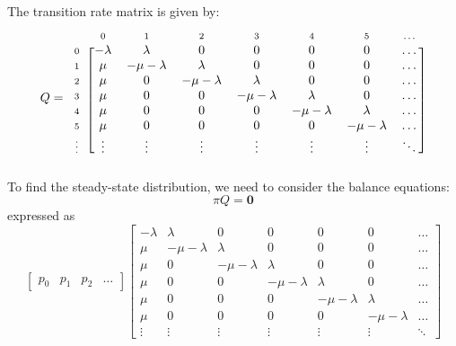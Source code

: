 \documentclass[12pt]{article}
\newcommand{\matindex}[1]{\mbox{\scriptsize#1}}%
\begin{document}
\noindent The transition rate matrix is given by: \begin{equation}
    Q = \begin{blockarray}{cccccccc}
        & \matindex{0} & \matindex{1} & \matindex{2} & \matindex{3} &\matindex{4} &\matindex{5} &\matindex{\dots} \\
        \begin{block}{c[ccccccc]}
            \matindex{0} & -\lambda & \lambda & 0 & 0 & 0 & 0 & \dots \\ 
            \matindex{1} & \mu & -\mu-\lambda & \lambda & 0 & 0 & 0 & \dots \\ 
            \matindex{2} & \mu & 0 & -\mu-\lambda & \lambda & 0 & 0 & \dots \\ 
            \matindex{3} & \mu & 0 & 0 & -\mu-\lambda & \lambda & 0 & \dots \\ 
            \matindex{4} & \mu & 0 & 0 & 0 & -\mu-\lambda & \lambda & \dots \\ 
            \matindex{5} & \mu & 0 & 0 & 0 & 0 & -\mu-\lambda & \dots \\ 
            \matindex{\vdots} & \vdots & \vdots & \vdots & \vdots & \vdots & \vdots & \ddots \\ 
        \end{block}
    \end{blockarray}
\end{equation} To find the steady-state distribution, we need to consider the balance equations: \begin{equation*}
    \pi Q = \mathbf{0} 
\end{equation*} expressed as \begin{equation*}
    \begin{bmatrix}
        p_{0} & p_{1} & p_{2} & \dots
    \end{bmatrix} \begin{bmatrix}
        -\lambda & \lambda & 0 & 0 & 0 & 0 & \dots \\ 
        \mu & -\mu-\lambda & \lambda & 0 & 0 & 0 & \dots \\ 
        \mu & 0 & -\mu-\lambda & \lambda & 0 & 0 & \dots \\ 
        \mu & 0 & 0 & -\mu-\lambda & \lambda & 0 & \dots \\ 
        \mu & 0 & 0 & 0 & -\mu-\lambda & \lambda & \dots \\ 
        \mu & 0 & 0 & 0 & 0 & -\mu-\lambda & \dots \\ 
        \vdots & \vdots & \vdots & \vdots & \vdots & \vdots & \ddots

\end{bmatrix}
\end{equation*}
\end{document}
